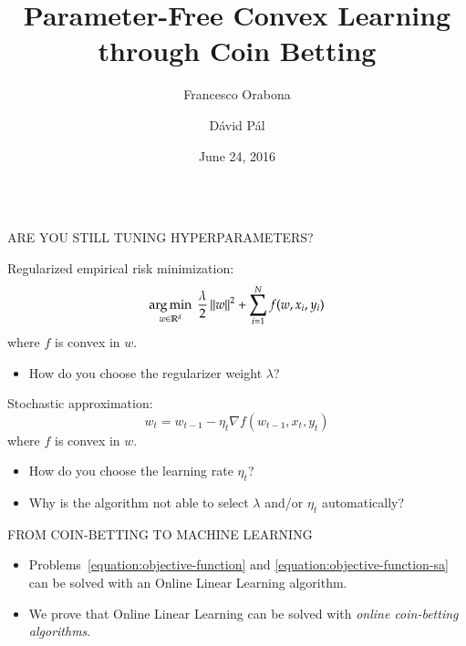 \documentclass[final,t,serif,mathserif]{beamer}
\title{\huge Parameter-Free Convex Learning through Coin Betting}
\author{Francesco Orabona \and D\'avid P\'al}
\institute[] %
{
  Yahoo Research, New York
}
\date[June 24, 2016]{June 24, 2016}
\newcommand{\grad}{\nabla}
\def\blockspacea{\vspace{0.cm}}
\begin{document}
\begin{frame}{}

\begin{columns}[t]

\begin{column}{.33\linewidth}

    \begin{block}{ARE YOU STILL TUNING HYPERPARAMETERS?}
      \blockspacea
      
      Regularized empirical risk minimization:
      \begin{equation}
      \label{equation:objective-function}
         \operatorname*{arg\,min}_{w \in \mathbb{R}^d} \ \frac{\lambda}{2} \left\|{w}\right\|^2 + \sum_{i=1}^N f(w, x_i, y_i)
      \end{equation}
      where $f$ is convex in $w$.
      \begin{itemize}
      \item How do you choose the regularizer weight $\lambda$?
      \end{itemize}
      
      \vspace{1cm}
      
      Stochastic approximation:
      \begin{equation}
      \label{equation:objective-function-sa}
         w_t = w_{t-1} - \eta_t \grad f(w_{t-1}, x_t, y_t)
      \end{equation}
      where $f$ is convex in $w$.
      \begin{itemize}
      \item How do you choose the learning rate $\eta_t$?
      \end{itemize}
      
      \vspace{1cm}
      
      \begin{itemize}      
      \item \alert{Why is the algorithm not able to select $\lambda$ and/or $\eta_t$ automatically?}
      \end{itemize}
      
      \blockspacea
    \end{block}

    \begin{block}{FROM COIN-BETTING TO MACHINE LEARNING}
    \blockspacea
    
    \begin{itemize}
      \item Problems~\eqref{equation:objective-function} and \eqref{equation:objective-function-sa} can be solved with an Online Linear Learning algorithm.
      \item We prove that Online Linear Learning can be solved with \emph{online coin-betting algorithms}.
    \end{itemize}


\end{block}
\end{column}
\end{columns}
\end{frame}
\end{document}
